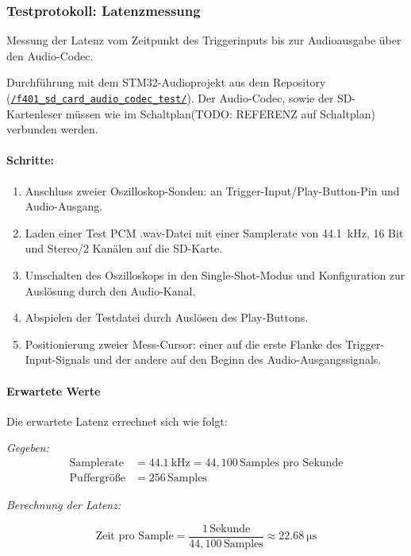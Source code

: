 \subsubsection{Testprotokoll: Latenzmessung}
\label{test-latenzmessung}

Messung der Latenz vom Zeitpunkt des Triggerinputs bis zur Audioausgabe über den Audio-Codec.

Durchführung mit dem STM32-Audioprojekt aus dem Repository (\href{run:../../f401_sd_card_audio_codec_test/}{\texttt{/f401\_sd\_card\_audio\_codec\_test/}}).
Der Audio-Codec, sowie der SD-Kartenleser müssen wie im Schaltplan(TODO: REFERENZ auf Schaltplan) verbunden werden.

\paragraph{Schritte:}
\begin{enumerate}
	\item Anschluss zweier Oszilloskop-Sonden: an Trigger-Input/Play-Button-Pin und Audio-Ausgang.
	\item Laden einer Test PCM .wav-Datei mit einer Samplerate von \SI{44.1}{\kilo\hertz}, 16 Bit und Stereo/2 Kanälen auf die SD-Karte.
	\item Umschalten des Oszilloskops in den Single-Shot-Modus und Konfiguration zur Auslösung durch den Audio-Kanal.
	\item Abspielen der Testdatei durch Auslösen des Play-Buttons.
	\item Positionierung zweier Mess-Cursor: einer auf die erste Flanke des Trigger-Input-Signals und der andere auf den Beginn des Audio-Ausgangssignals.
\end{enumerate}
\paragraph{Erwartete Werte}
	Die erwartete Latenz errechnet sich wie folgt:
	
	\textit{Gegeben:}
	\begin{align*}
		\text{Samplerate} &= \SI{44.1}{\kilo\hertz} = 44{,}100 \, \text{Samples pro Sekunde} \\
		\text{Puffergröße} &= 256 \, \text{Samples}
	\end{align*}
	
	\textit{Berechnung der Latenz:}
	
	\[
	\text{Zeit pro Sample} = \frac{1 \, \text{Sekunde}}{44{,}100 \, \text{Samples}} \approx \SI{22.68}{\micro\second}
	\]
	
